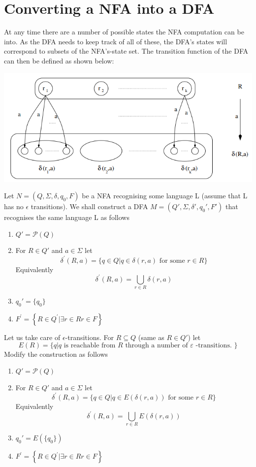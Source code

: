\documentclass{article}[18pt]
\begin{document}
\section{Converting a NFA into a DFA}
At any time there are a number of possible states the NFA computation can be into. As the DFA needs to keep track of all of these, the DFA's states will correspond to subsets of the NFA's-state set. The transition function of the DFA can then be defined as shown below:
\begin{center}
	\includegraphics[scale=0.7]{"NFA to DFA"}
\end{center}
Let $N=(Q,\Sigma, \delta, q_0, F)$ be a NFA recognising some language L (assume that L has no $\epsilon$ transitions). We shall construct a DFA $M=(Q',\Sigma, \delta', q_0', F')$ that recognises the same language L as follows
\begin{enumerate}
	\item $Q'=\mathscr{P}(Q)$
	\item For $R\in Q'$ and $a\in \Sigma$ let
	\[
	\delta^{\prime}(R, a)=\{q \in Q | q \in \delta(r, a) \text { for some } r \in R\}
	\]
	Equivalently
	\[
	\delta^{\prime}(R, a)=\bigcup_{r \in R} \delta(r, a)
	\]
	\item $q_0'=\{q_0\}$
	\item \(F^{\prime}=\left\{R \in Q^{\prime} | \exists r \in R r \in F\right\}\)
\end{enumerate}
Let us take care of $\epsilon$-transitions. For $R\subseteq Q$ (same as $R\in Q'$) let\\
$$E(R)=\{q | q \text { is reachable from } R \text { through a number of } \varepsilon \text { -transitions. }\}$$
Modify the construction as follows
\begin{enumerate}
	\item $Q'=\mathscr{P}(Q)$
	\item For $R\in Q'$ and $a\in \Sigma$ let
	\[
	\delta^{\prime}(R, a)=\{q \in Q | q \in E( \delta(r, a)) \text { for some } r \in R\}
	\]
	Equivalently
	\[
	\delta^{\prime}(R, a)=\bigcup_{r \in R} E(\delta(r, a))
	\]
	\item $q_0'=E(\{q_0\})$
	\item \(F^{\prime}=\left\{R \in Q^{\prime} | \exists r \in R r \in F\right\}\)
\end{enumerate}
\end{document}
